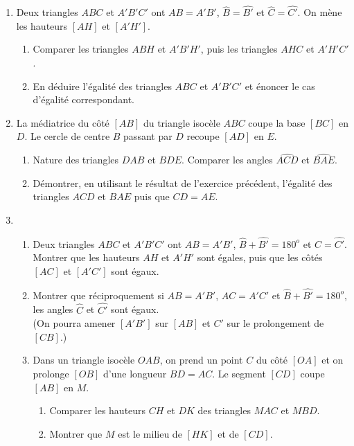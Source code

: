\documentclass[12 pt]{report}
\theoremstyle{plain}
\newcounter{n}
\begin{document}
\begin{enumerate}
\begin{enumerate}
\end{enumerate}
\item Deux triangles $ABC$ et $A'B'C'$ ont $AB=A'B'$, $\widehat{B}=\widehat{B'}$ et $\widehat{C}=\widehat{C'}$. On mène les hauteurs $[AH]$ et $[A'H']$. \begin{enumerate}
\item Comparer les triangles $ABH$ et $A'B'H'$, puis les triangles $AHC$ et $A'H'C'$.
\item En déduire l'égalité des triangles $ABC$ et $A'B'C'$ et énoncer le cas 
d'égalité correspondant.
\end{enumerate}
\item La médiatrice du côté $[AB]$ du triangle isocèle $ABC$ coupe la base $[BC]$ en $D$. Le cercle de centre $B$ passant par $D$ recoupe $[AD]$ en $E$. \begin{enumerate}
\item Nature des triangles $DAB$ et $BDE$. Comparer les angles $\widehat{ACD}$ et 
$\widehat{BAE}$. 
\item Démontrer, en utilisant le résultat de l'exercice précédent, l'égalité
des triangles $ACD$ et $BAE$ puis que $CD=AE$.
\end{enumerate}
\item \begin{enumerate}
\item Deux triangles $ABC$ et $A'B'C'$ ont $AB=A'B'$, $\widehat{B}+\widehat{B'}=180^o$ et $\widehat{C}= \widehat{C'}$. Montrer que les hauteurs $AH$ et $A'H'$ sont égales, puis que les côtés $[AC]$ et $[A'C']$ sont égaux.
\item Montrer que réciproquement si $AB=A'B'$, $AC=A'C'$ et $\widehat{B}+\widehat{B'}=180^o$, les angles $\widehat{C}$ et $\widehat{C'}$ sont égaux. \\ (On pourra amener $[A'B']$ sur $[AB]$ et $C'$ sur le prolongement de $[CB]$.)
\item Dans un triangle isocèle $OAB$, on prend un point $C$ du côté $[OA]$ et on
prolonge $[OB]$ d'une longueur $BD=AC$. Le segment $[CD]$ coupe $[AB]$ en $M$. 
\begin{enumerate}
\item Comparer les hauteurs $CH$ et $DK$ des triangles $MAC$ et $MBD$. 
\item Montrer que $M$ est le milieu de $[HK]$ et de $[CD]$.
\end{enumerate}
\end{enumerate}
\end{enumerate}
\end{document}
